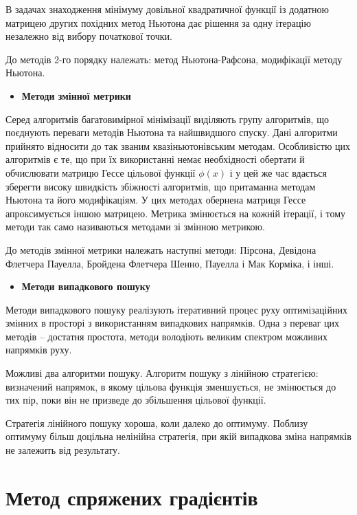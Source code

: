 	В задачах знаходження мінімуму довільної квадратичної функції із додатною матрицею других похідних метод Ньютона дає рішення за одну ітерацію незалежно від вибору початкової точки. 
	
	До методів 2-го порядку належать: метод Ньютона-Рафсона, модифікації методу Ньютона.
\begin{itemize}	
	\item \textbf{Методи змінної метрики}
\end{itemize}

	Серед алгоритмів багатовимірної мінімізації виділяють групу алгоритмів, що поєднують переваги методів Ньютона та найшвидшого спуску. Дані алгоритми прийнято відносити до так званим квазіньютонівським методам. Особливістю цих алгоритмів є те, що при їх використанні немає необхідності обертати й обчислювати матрицю Гессе цільової функції $\phi(x)$ і у цей же час вдається зберегти високу швидкість збіжності алгоритмів, що притаманна методам Ньютона та його модифікаціям. У цих методах обернена матриця Гессе апроксимується іншою матрицею. Метрика змінюється на кожній ітерації, і тому методи так само називаються методами зі змінною метрикою. 
	
	До методів змінної метрики належать наступні методи: Пірсона, Девідона Флетчера Пауелла, Бройдена Флетчера Шенно, Пауелла і Мак Корміка, і інші.
\begin{itemize}
	\item \textbf{Методи випадкового пошуку} 
\end{itemize}

	Методи випадкового пошуку реалізують ітеративний процес руху оптимізаційних змінних в просторі з використанням випадкових напрямків. Одна з переваг цих методів – достатня простота, методи володіють великим спектром можливих напрямків руху. 
		
	Можливі два алгоритми пошуку. Алгоритм пошуку з лінійною стратегією: визначений напрямок, в якому цільова функція зменшується, не змінюється до тих пір, поки він не призведе до збільшення цільової функції. 
		
	Стратегія лінійного пошуку хороша, коли далеко до оптимуму. Поблизу оптимуму більш доцільна нелінійна стратегія, при якій випадкова зміна напрямків не залежить від результату.


\section {Метод спряжених градієнтів}


